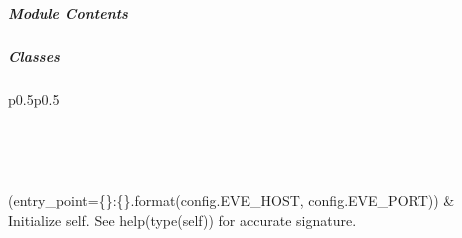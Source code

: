 \documentclass[letterpaper,10pt,english]{sphinxmanual}
\begin{document}
\subparagraph{}
\label{\detokenize{autoapi/pine/pipelines/EveClient/index:module-pine.pipelines.EveClient}}\label{\detokenize{autoapi/pine/pipelines/EveClient/index:pine-pipelines-eveclient}}\label{\detokenize{autoapi/pine/pipelines/EveClient/index::doc}}

\subparagraph{Module Contents}
\label{\detokenize{autoapi/pine/pipelines/EveClient/index:module-contents}}

\subparagraph{Classes}
\label{\detokenize{autoapi/pine/pipelines/EveClient/index:classes}}

\begin{savenotes}\sphinxatlongtablestart\begin{longtable}[c]{p{0.5\linewidth}p{0.5\linewidth}}
\hline

\endfirsthead

%
{}\\
\hline

\endhead

\hline
{}\\
\endfoot

\endlastfoot

{\hyperref[\detokenize{autoapi/pine/pipelines/EveClient/index:pine.pipelines.EveClient.EveClient}]{}}(entry\_point=\textquotesingle{}\{\}:\{\}\textquotesingle{}.format(config.EVE\_HOST, config.EVE\_PORT))
&
Initialize self.  See help(type(self)) for accurate signature.
\\
\hline
\end{longtable}\sphinxatlongtableend\end{savenotes}

\begin{fulllineitems}
\label{\detokenize{autoapi/pine/pipelines/EveClient/index:pine.pipelines.EveClient.logger}}
\end{fulllineitems}
\end{document}
